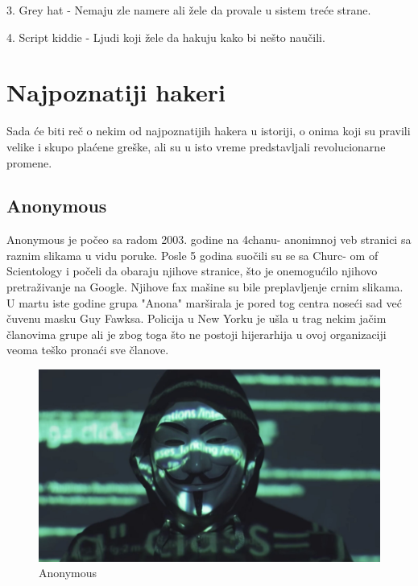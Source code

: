 \documentclass[a4paper]{article}
\begin{document}
3. Grey hat - Nemaju zle namere ali žele da provale u sistem treće strane.
\newline

4. Script kiddie - Ljudi koji žele da hakuju kako bi nešto naučili.
\newpage



\section{Najpoznatiji hakeri}
\label{hakeri}
Sada će biti reč o nekim od najpoznatijih hakera u istoriji, o onima koji su pravili velike i skupo plaćene greške, ali su u isto vreme predstavljali revolucionarne promene.
\newline
\subsection{Anonymous}
Anonymous je počeo sa radom 2003. godine na 4chanu- anonimnoj veb stranici sa raznim slikama u vidu poruke. Posle 5 godina  suočili su se sa Churc- om of Scientology i počeli da obaraju njihove stranice, što je onemogućilo njihovo pretraživanje na Google. Njihove fax mašine su bile preplavljenje crnim slikama. U martu iste godine grupa "Anona" marširala je pored tog centra noseći sad već čuvenu masku  Guy Fawksa. Policija u New Yorku je ušla u trag nekim jačim članovima grupe ali je zbog toga što ne postoji hijerarhija u ovoj organizaciji veoma teško pronaći sve članove.





\begin{figure}[h!]
\begin{center}
\includegraphics[scale=0.10]{anonymous.jpg}
\end{center}
\caption{Anonymous}
\label{fig:anonymous}
\end{figure}
\end{document}
